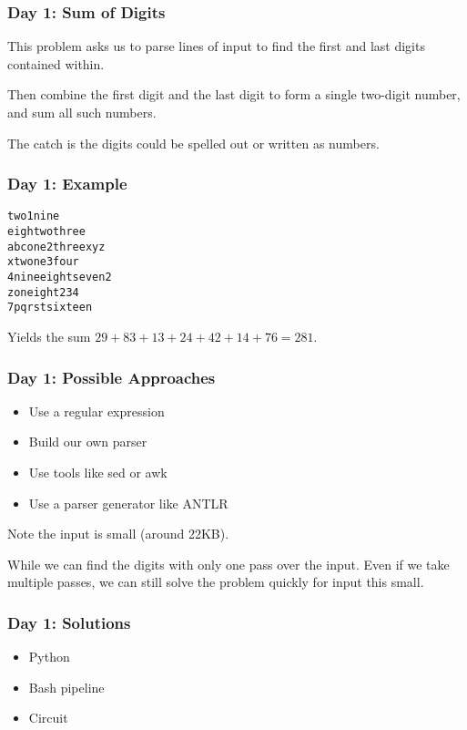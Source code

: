 \begin{frame}
\frametitle{Day 1: Sum of Digits}

This problem asks us to parse lines of input to find the first and last digits contained within.\vfill

Then combine the first digit and the last digit to form a single two-digit number, and sum all such numbers.\vfill

The catch is the digits could be spelled out or written as numbers.
\end{frame}

\begin{frame}[fragile]
\frametitle{Day 1: Example}

\begin{verbatim}
two1nine
eightwothree
abcone2threexyz
xtwone3four
4nineeightseven2
zoneight234
7pqrstsixteen
\end{verbatim}

Yields the sum $29 + 83 + 13 + 24 + 42 + 14 + 76 = 281$.

\end{frame}

\begin{frame}
\frametitle{Day 1: Possible Approaches}

\begin{itemize}
    \item Use a regular expression
    \item Build our own parser
    \item Use tools like sed or awk
    \item Use a parser generator like ANTLR
\end{itemize}\vfill

Note the input is small (around 22KB).\vfill

While we can find the digits with only one pass over the input. Even if we
take multiple passes, we can still solve the problem quickly for input
this small.
\end{frame}

\begin{frame}
\frametitle{Day 1: Solutions}

\begin{itemize}
    \item Python
    \item Bash pipeline
    \item Circuit
\end{itemize}

\end{frame}
